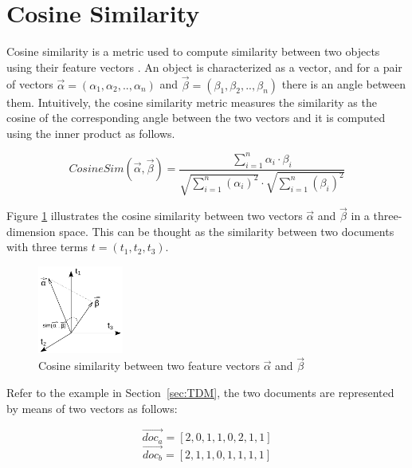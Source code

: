 \section{Cosine Similarity} \label{sec:CosineSimilarity}

Cosine similarity is a metric used to compute similarity between two objects using their feature vectors \cite{tversky1977features}. An object is characterized as a vector, and for a pair of vectors $\vec{\alpha}=(\alpha_{1},\alpha_{2},..,\alpha_{n})$ and $\vec{\beta}=(\beta_{1},\beta_{2},..,\beta_{n})$ there is an angle between them. Intuitively, the cosine similarity metric measures the similarity as the cosine of the corresponding angle between the two vectors and it is computed using the inner product as follows. 

\begin{equation} \label{eqn:Cosine}
CosineSim(\vec{\alpha},\vec{\beta}) = \frac{\sum_{i=1}^{n}\alpha_{i}\cdot \beta_{i}}{\sqrt{\sum_{i=1}^{n}(\alpha_{i})^{2} }\cdot \sqrt{\sum_{i=1}^{n}(\beta_{i})^{2}}}
\end{equation}

Figure \ref{fig:Cosine} illustrates the cosine similarity between two vectors $\vec{\alpha}$ and $\vec{\beta}$ in a three-dimension space. This can be thought as the similarity between two documents with three terms $t=(t_{1},t_{2},t_{3})$.

\begin{figure}[h!]
	\centering
	\includegraphics[width=0.25\textwidth]{images/Cosine.pdf}
	\caption{Cosine similarity between two feature vectors $\vec{\alpha}$ and $\vec{\beta}$}
	\label{fig:Cosine}
\end{figure}

Refer to the example in Section~\ref{sec:TDM}, the two documents are represented by means of two vectors as follows: 

%
	\begin{equation} \nonumber
	\vec{doc_a} = [2, 0, 1, 1, 0, 2, 1, 1]
	\end{equation}
	\begin{equation} \nonumber
	\vec{doc_b} = [2, 1, 1, 0, 1, 1, 1, 1]
	\end{equation}

